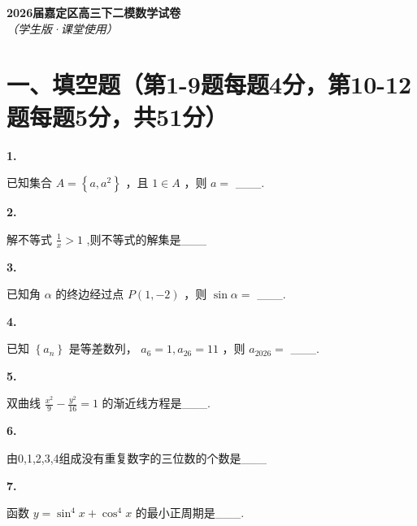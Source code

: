 \documentclass[10pt]{article}
\newcommand{\boardspace}[1]{%
  \par\vspace{#1}
}
\newenvironment{questionblock}[1]{%
  \needspace{3\baselineskip}%
  \noindent\textbf{#1.}%
}{%
  \par\vspace{1em}%
}
\begin{document}
\begin{center}
\Large\textbf{2026届嘉定区高三下二模数学试卷}\\[0.5em]
\normalsize\textit{（学生版·课堂使用）}
\end{center}

\section*{一、填空题（第1-9题每题4分，第10-12题每题5分，共51分）}

\begin{questionblock}{1}
已知集合 \(A = \left\{  {a,{a}^{2}}\right\}\) ，且 \(1 \in  A\) ，则 \(a =\) ___.
\end{questionblock}

\boardspace{1.5cm}

\begin{questionblock}{2}
解不等式 \(\frac{1}{x} > 1\) ,则不等式的解集是___
\end{questionblock}

\boardspace{1.5cm}

\begin{questionblock}{3}
已知角 \(\alpha\) 的终边经过点 \(P\left( {1, - 2}\right)\) ，则 \(\sin \alpha  =\) ___.
\end{questionblock}

\boardspace{1.5cm}

\begin{questionblock}{4}
已知 \(\left\{  {a}_{n}\right\}\) 是等差数列， \({a}_{6} = 1,{a}_{26} = {11}\) ，则 \({a}_{2026} =\) ___.
\end{questionblock}

\boardspace{1.5cm}

\begin{questionblock}{5}
双曲线 \(\frac{{x}^{2}}{9} - \frac{{y}^{2}}{16} = 1\) 的渐近线方程是___.
\end{questionblock}

\boardspace{1.5cm}

\begin{questionblock}{6}
由0,1,2,3,4组成没有重复数字的三位数的个数是___
\end{questionblock}

\boardspace{1.5cm}

\begin{questionblock}{7}
函数 \(y = {\sin }^{4}x + {\cos }^{4}x\) 的最小正周期是___.
\end{questionblock}

\boardspace{1.5cm}
\end{document}
